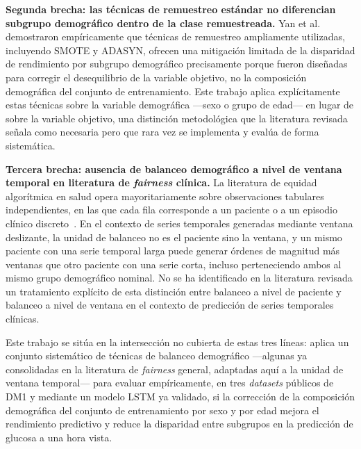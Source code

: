 \textbf{Segunda brecha: las técnicas de remuestreo estándar no diferencian subgrupo demográfico dentro de la clase remuestreada.} Yan et al.~\cite{yan2022doubleprioritized} demostraron empíricamente que técnicas de remuestreo ampliamente utilizadas, incluyendo SMOTE y ADASYN, ofrecen una mitigación limitada de la disparidad de rendimiento por subgrupo demográfico precisamente porque fueron diseñadas para corregir el desequilibrio de la variable objetivo, no la composición demográfica del conjunto de entrenamiento. Este trabajo aplica explícitamente estas técnicas sobre la variable demográfica —sexo o grupo de edad— en lugar de sobre la variable objetivo, una distinción metodológica que la literatura revisada señala como necesaria pero que rara vez se implementa y evalúa de forma sistemática.

\textbf{Tercera brecha: ausencia de balanceo demográfico a nivel de ventana temporal en literatura de \emph{fairness} clínica.} La literatura de equidad algorítmica en salud opera mayoritariamente sobre observaciones tabulares independientes, en las que cada fila corresponde a un paciente o a un episodio clínico discreto~\cite{wang2024disparate,yan2022doubleprioritized,ricci2024sociodemographic}. En el contexto de series temporales generadas mediante ventana deslizante, la unidad de balanceo no es el paciente sino la ventana, y un mismo paciente con una serie temporal larga puede generar órdenes de magnitud más ventanas que otro paciente con una serie corta, incluso perteneciendo ambos al mismo grupo demográfico nominal. No se ha identificado en la literatura revisada un tratamiento explícito de esta distinción entre balanceo a nivel de paciente y balanceo a nivel de ventana en el contexto de predicción de series temporales clínicas.

Este trabajo se sitúa en la intersección no cubierta de estas tres líneas: aplica un conjunto sistemático de técnicas de balanceo demográfico —algunas ya consolidadas en la literatura de \emph{fairness} general, adaptadas aquí a la unidad de ventana temporal— para evaluar empíricamente, en tres \emph{datasets} públicos de DM1 y mediante un modelo LSTM ya validado, si la corrección de la composición demográfica del conjunto de entrenamiento por sexo y por edad mejora el rendimiento predictivo y reduce la disparidad entre subgrupos en la predicción de glucosa a una hora vista.


